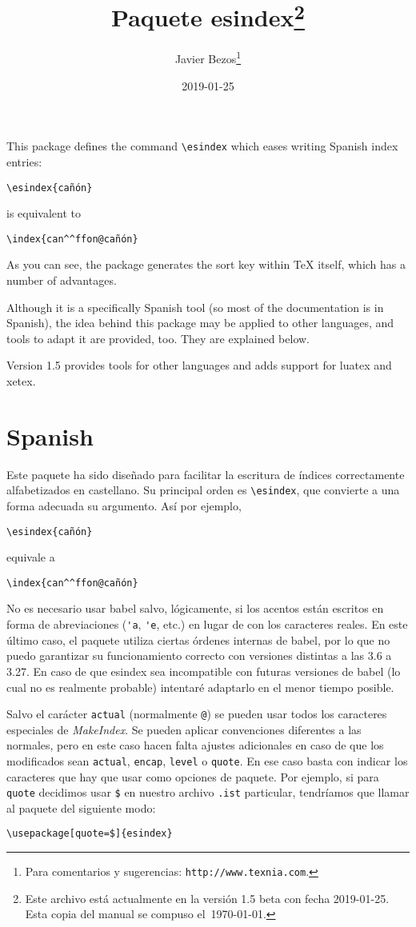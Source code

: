 \documentclass{article}
\title{Paquete \textsf{esindex}\footnote{Este
     archivo est\'a actualmente en la versión 1.5 beta
     con fecha 2019-01-25.
     Esta copia del manual se compuso el~\today.}}
\author{Javier Bezos\footnote{Para comentarios y sugerencias: 
\texttt{http://www.texnia.com}.}}
\date{2019-01-25}
\begin{document}
\maketitle

This package defines the command \verb|\esindex| which eases writing
Spanish index entries:
\begin{verbatim}
\esindex{cañón}
\end{verbatim}
is equivalent to
\begin{verbatim}
\index{can^^ffon@cañón}
\end{verbatim}
As you can see, the package generates the sort key within \TeX{}
itself, which has a number of advantages.

Although it is a specifically Spanish tool (so most of the
documentation is in Spanish), the idea behind this package may be
applied to other languages, and tools to adapt it are provided, too.
They are explained below.

Version 1.5 provides tools for other languages and adds support for
\textsf{luatex} and \textsf{xetex}.

\section{Spanish}

Este paquete ha sido diseñado para facilitar la escritura de índices
correctamente alfabetizados en castellano. Su principal orden es
\verb|\esindex|, que convierte a una forma adecuada su argumento. Así
por ejemplo,
\begin{verbatim}
\esindex{cañón}
\end{verbatim}
equivale a
\begin{verbatim}
\index{can^^ffon@cañón}
\end{verbatim}
No es necesario usar \textsf{babel} salvo, lógicamente, si los acentos
están escritos en forma de abreviaciones (\verb|'a|, \verb|'e|, etc.)
en lugar de con los caracteres reales. En este último caso, el paquete
utiliza ciertas órdenes internas de \textsf{babel}, por lo que no puedo
garantizar su funcionamiento correcto con versiones distintas a las 3.6
a 3.27. En caso de que \textsf{esindex} sea incompatible con futuras
versiones de \textsf{babel} (lo cual no es realmente probable)
intentaré adaptarlo en el menor tiempo posible.

Salvo el carácter \verb|actual| (normalmente \verb|@|) se pueden usar
todos los caracteres especiales de \textit{MakeIndex}. Se pueden
aplicar convenciones diferentes a las normales, pero en este caso hacen
falta ajustes adicionales en caso de que los modificados sean
\verb|actual|, \verb|encap|, \verb|level| o \verb|quote|. En ese caso
basta con indicar los caracteres que hay que usar como opciones de
paquete. Por ejemplo, si para \verb|quote| decidimos usar \verb|$| en
nuestro archivo \verb|.ist| particular, tendríamos que llamar al
paquete del siguiente modo:
\begin{verbatim}
\usepackage[quote=$]{esindex}
\end{verbatim}
\end{document}
